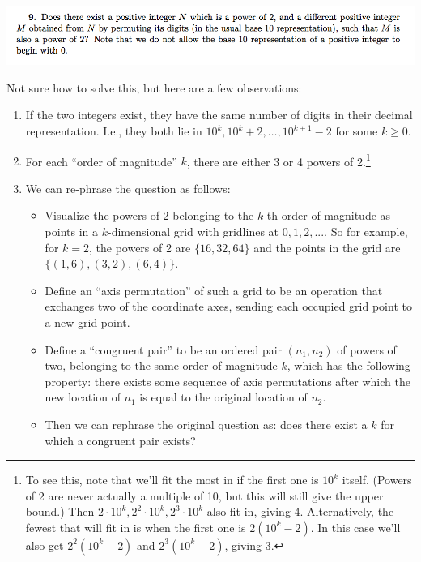 \documentclass[12pt]{article}
\begin{document}
\subsection*{}
\includegraphics[width=450pt]{img/iulm-9.png}
\begin{mdframed}
  Not sure how to solve this, but here are a few observations:
  \begin{enumerate}
  \item If the two integers exist, they have the same number of digits in their
    decimal representation. I.e., they both lie in
    ${10^k,10^k + 2, \ldots, 10^{k+1} - 2}$ for some $k \geq 0$.
  \item For each ``order of magnitude'' $k$, there are either 3 or 4 powers of
    2.\footnote{To see this, note that we'll fit the most in if the first one
      is $10^k$ itself. (Powers of 2 are never actually a multiple of 10, but
      this will still give the upper bound.) Then
      $2\cdot 10^k, 2^2\cdot 10^k,2^3\cdot 10^k$ also fit in, giving
      4. Alternatively, the fewest that will fit in is when the first one is
      $2(10^k - 2)$. In this case we'll also get $2^2(10^k - 2)$ and
      $2^3(10^k - 2)$, giving 3.}
  \item We can re-phrase the question as follows:
    \begin{itemize}
    \item Visualize the powers of 2 belonging to the $k$-th order
      of magnitude as points in a $k$-dimensional grid with gridlines at
      $0, 1, 2, ...$. So for example, for $k=2$, the powers of 2 are
      $\{16, 32, 64\}$ and the points in the grid are
      $\{(1,6), (3,2), (6,4)\}$.
    \item Define an ``axis permutation'' of such a grid to be an operation that
      exchanges two of the coordinate axes, sending each occupied grid point to a
      new grid point.
    \item Define a ``congruent pair'' to be an ordered pair $(n_1, n_2)$ of
      powers of two, belonging to the same order of magnitude $k$, which has
      the following property: there exists some sequence of axis permutations
      after which the new location of $n_1$ is equal to the original location
      of $n_2$.
    \item Then we can rephrase the original question as: does there exist a $k$
      for which a congruent pair exists?
    \end{itemize}
  \end{enumerate}


\end{mdframed}
\end{document}
